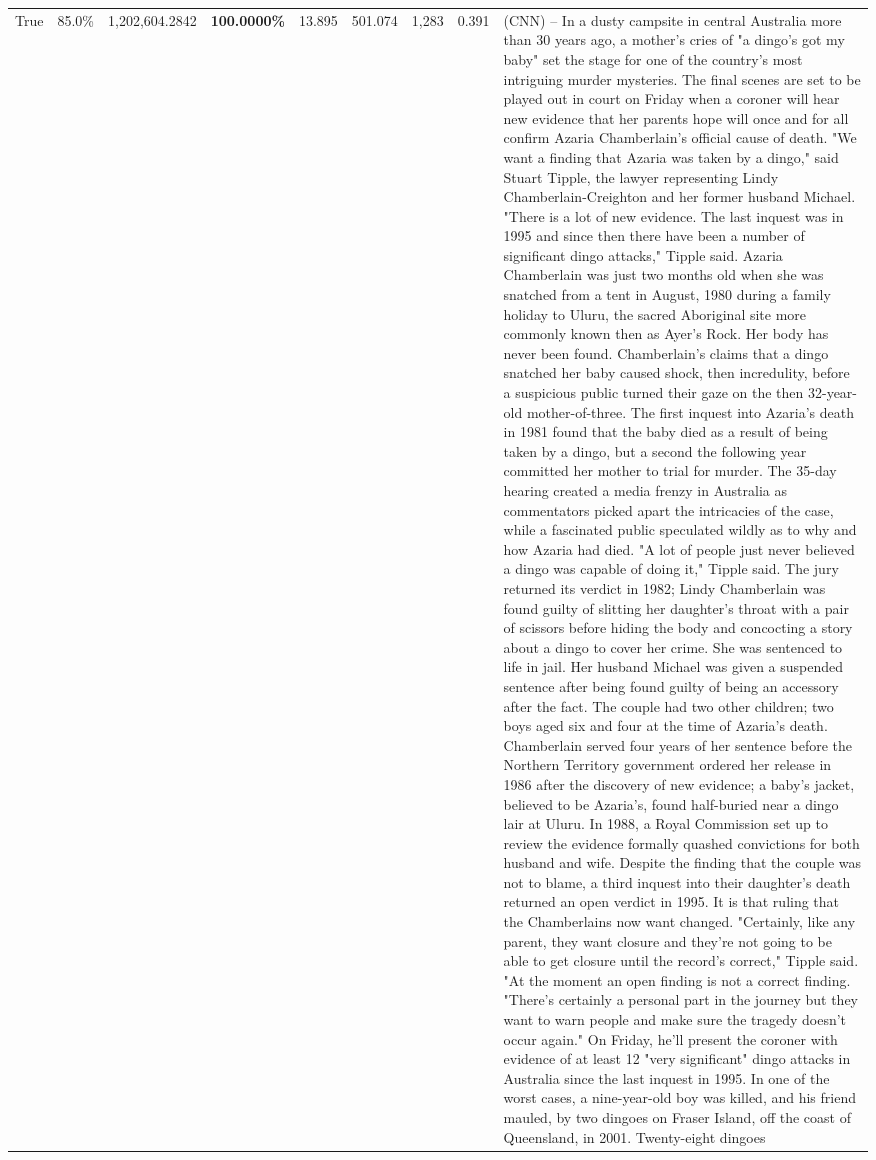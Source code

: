 \begin{table}[H]
\begin{tabular}{lllrlllll}
True & 85.0\% & 1,202,604.2842 & \bfseries \color{red} 100.0000\% & 13.895 & 501.074 & 1,283 & 0.391 & (CNN) -- In a dusty campsite in central Australia more than 30 years ago, a mother's cries of "a dingo's got my baby" set the stage for one of the country's most intriguing murder mysteries. The final scenes are set to be played out in court on Friday when a coroner will hear new evidence that her parents hope will once and for all confirm Azaria Chamberlain's official cause of death. "We want a finding that Azaria was taken by a dingo," said Stuart Tipple, the lawyer representing Lindy Chamberlain-Creighton and her former husband Michael. "There is a lot of new evidence. The last inquest was in 1995 and since then there have been a number of significant dingo attacks," Tipple said. Azaria Chamberlain was just two months old when she was snatched from a tent in August, 1980 during a family holiday to Uluru, the sacred Aboriginal site more commonly known then as Ayer's Rock. Her body has never been found. Chamberlain's claims that a dingo snatched her baby caused shock, then incredulity, before a suspicious public turned their gaze on the then 32-year-old mother-of-three. The first inquest into Azaria's death in 1981 found that the baby died as a result of being taken by a dingo, but a second the following year committed her mother to trial for murder. The 35-day hearing created a media frenzy in Australia as commentators picked apart the intricacies of the case, while a fascinated public speculated wildly as to why and how Azaria had died. "A lot of people just never believed a dingo was capable of doing it," Tipple said. The jury returned its verdict in 1982; Lindy Chamberlain was found guilty of slitting her daughter's throat with a pair of scissors before hiding the body and concocting a story about a dingo to cover her crime. She was sentenced to life in jail. Her husband Michael was given a suspended sentence after being found guilty of being an accessory after the fact. The couple had two other children; two boys aged six and four at the time of Azaria's death. Chamberlain served four years of her sentence before the Northern Territory government ordered her release in 1986 after the discovery of new evidence; a baby's jacket, believed to be Azaria's, found half-buried near a dingo lair at Uluru. In 1988, a Royal Commission set up to review the evidence formally quashed convictions for both husband and wife. Despite the finding that the couple was not to blame, a third inquest into their daughter's death returned an open verdict in 1995. It is that ruling that the Chamberlains now want changed. "Certainly, like any parent, they want closure and they're not going to be able to get closure until the record's correct," Tipple said. "At the moment an open finding is not a correct finding. "There's certainly a personal part in the journey but they want to warn people and make sure the tragedy doesn't occur again." On Friday, he'll present the coroner with evidence of at least 12 "very significant" dingo attacks in Australia since the last inquest in 1995. In one of the worst cases, a nine-year-old boy was killed, and his friend mauled, by two dingoes on Fraser Island, off the coast of Queensland, in 2001. Twenty-eight dingoes 
\end{tabular}
\end{table}
